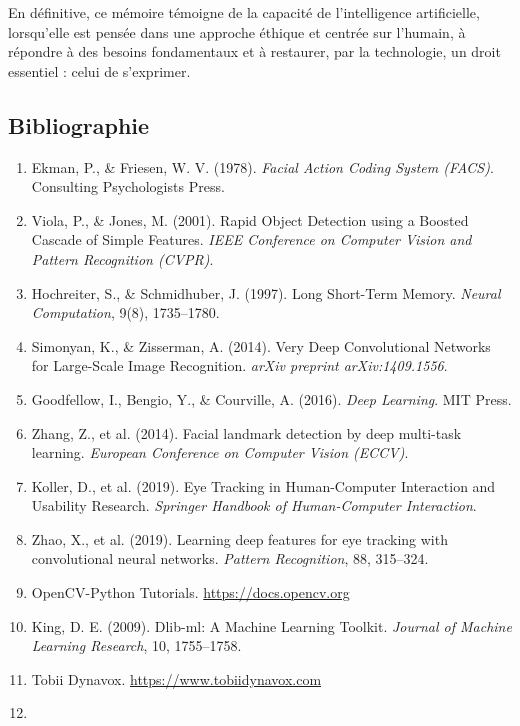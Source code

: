 \documentclass[
]{article}
\begin{document}
En définitive, ce mémoire témoigne de la capacité de l'intelligence artificielle, lorsqu'elle est pensée dans une approche éthique et centrée sur l'humain, à répondre à des besoins fondamentaux et à restaurer, par la technologie, un droit essentiel : celui de s'exprimer.

\hypertarget{bibliographie}{%
\subsection{Bibliographie}\label{bibliographie}}

\begin{enumerate}
\def\labelenumi{\arabic{enumi}.}
\item
  Ekman, P., \& Friesen, W. V. (1978). \emph{Facial Action Coding System (FACS)}. Consulting Psychologists Press.
\item
  Viola, P., \& Jones, M. (2001). Rapid Object Detection using a Boosted Cascade of Simple Features. \emph{IEEE Conference on Computer Vision and Pattern Recognition (CVPR)}.
\item
  Hochreiter, S., \& Schmidhuber, J. (1997). Long Short-Term Memory. \emph{Neural Computation}, 9(8), 1735--1780.
\item
  Simonyan, K., \& Zisserman, A. (2014). Very Deep Convolutional Networks for Large-Scale Image Recognition. \emph{arXiv preprint arXiv:1409.1556}.
\item
  Goodfellow, I., Bengio, Y., \& Courville, A. (2016). \emph{Deep Learning}. MIT Press.
\item
  Zhang, Z., et al. (2014). Facial landmark detection by deep multi-task learning. \emph{European Conference on Computer Vision (ECCV)}.
\item
  Koller, D., et al. (2019). Eye Tracking in Human-Computer Interaction and Usability Research. \emph{Springer Handbook of Human-Computer Interaction}.
\item
  Zhao, X., et al. (2019). Learning deep features for eye tracking with convolutional neural networks. \emph{Pattern Recognition}, 88, 315--324.
\item
  OpenCV-Python Tutorials. \underline{https://docs.opencv.org\\
  }
\item
  King, D. E. (2009). Dlib-ml: A Machine Learning Toolkit. \emph{Journal of Machine Learning Research}, 10, 1755--1758.
\item
  Tobii Dynavox. \underline{https://www.tobiidynavox.com\\
  }
\item

\end{enumerate}
\end{document}

